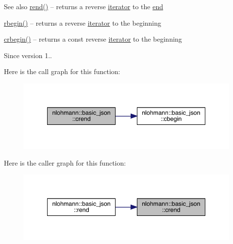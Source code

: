 \begin{DoxySeeAlso}{See also}
\mbox{\hyperlink{classnlohmann_1_1basic__json_ac77aed0925d447744676725ab0b6d535}{rend()}} -- returns a reverse \mbox{\hyperlink{classnlohmann_1_1basic__json_a099316232c76c034030a38faa6e34dca}{iterator}} to the \mbox{\hyperlink{classnlohmann_1_1basic__json_a13e032a02a7fd8a93fdddc2fcbc4763c}{end}} 

\mbox{\hyperlink{classnlohmann_1_1basic__json_a1ef93e2006dbe52667294f5ef38b0b10}{rbegin()}} -- returns a reverse \mbox{\hyperlink{classnlohmann_1_1basic__json_a099316232c76c034030a38faa6e34dca}{iterator}} to the beginning 

\mbox{\hyperlink{classnlohmann_1_1basic__json_a1e0769d22d54573f294da0e5c6abc9de}{crbegin()}} -- returns a const reverse \mbox{\hyperlink{classnlohmann_1_1basic__json_a099316232c76c034030a38faa6e34dca}{iterator}} to the beginning
\end{DoxySeeAlso}
\begin{DoxySince}{Since}
version 1.. 
\end{DoxySince}
Here is the call graph for this function\+:\nopagebreak
\begin{figure}[H]
\begin{center}
\leavevmode
\includegraphics[width=341pt]{classnlohmann_1_1basic__json_a5795b029dbf28e0cb2c7a439ec5d0a88_cgraph}
\end{center}
\end{figure}
Here is the caller graph for this function\+:\nopagebreak
\begin{figure}[H]
\begin{center}
\leavevmode
\includegraphics[width=341pt]{classnlohmann_1_1basic__json_a5795b029dbf28e0cb2c7a439ec5d0a88_icgraph}
\end{center}
\end{figure}
